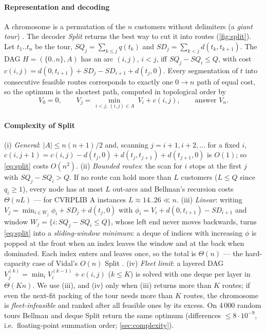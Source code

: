 \paragraph{Representation and decoding} A chromosome is a permutation of the $n$ customers without
delimiters (a \emph{giant tour}) \citep{beasley1983route,prins2004simple}. The decoder \emph{Split}
returns the best way to cut it into routes (\cref{fig:split}). Let $t_1..t_n$ be the tour,
$\mathit{SQ}_j=\sum_{k\le j}q(t_k)$ and $\mathit{SD}_j=\sum_{k<j}d(t_k,t_{k+1})$.
The DAG $H=(\{0..n\},A)$ has an arc $(i,j)$, $i<j$, iff $\mathit{SQ}_j-\mathit{SQ}_i\le Q$, with cost
$c(i,j)=d(0,t_{i+1})+\mathit{SD}_j-\mathit{SD}_{i+1}+d(t_j,0)$. Every segmentation of $t$ into consecutive
feasible routes corresponds to exactly one $0\to n$ path of equal cost, so the optimum is the shortest path,
computed in topological order by
\begin{equation}
V_0=0,\qquad V_j=\min_{\,i<j,\ (i,j)\in A}\ V_i+c(i,j),\qquad \text{answer } V_n. \label{eq:split}
\end{equation}
\paragraph{Complexity of Split} (i) \emph{General}: $|A|\le n(n+1)/2$ and, scanning $j=i+1,i+2,\dots$ for a
fixed $i$, $c(i,j+1)=c(i,j)-d(t_j,0)+d(t_j,t_{j+1})+d(t_{j+1},0)$ is $O(1)$; so \eqref{eq:split} costs
$O(n^2)$. (ii) \emph{Bounded routes}: the scan for $i$ stops at the first $j$ with
$\mathit{SQ}_j-\mathit{SQ}_i>Q$. If no route can hold more than $L$ customers ($L\le Q$ since $q_i\ge1$),
every node has at most $L$ out-arcs and Bellman's recursion costs $\Theta(nL)$ --- for CVRPLIB A
instances $L\approx14..26\ll n$. (iii) \emph{Linear}: writing $V_j=\min_{i\in W_j}\phi_i+\mathit{SD}_j+d(t_j,0)$
with $\phi_i=V_i+d(0,t_{i+1})-\mathit{SD}_{i+1}$ and window $W_j=\{i:\mathit{SQ}_j-\mathit{SQ}_i\le Q\}$, whose left end
never moves backwards, turns \eqref{eq:split} into a \emph{sliding-window minimum}: a deque of
indices with increasing $\phi$ is popped at the front when an index leaves the window and at the back when
dominated. Each index enters and leaves once, so the total is $\Theta(n)$ --- the hard-capacity case of
Vidal's $O(n)$ Split \citep{vidal2016split}. (iv) \emph{Fleet limit}: a layered DAG
$V^{(k)}_j=\min_i V^{(k-1)}_i+c(i,j)$ ($k\le K$) is solved with one deque per layer in $\Theta(Kn)$. We use (iii),
and (iv) only when (iii) returns more than $K$ routes; if even the next-fit packing of the tour needs more
than $K$ routes, the chromosome is \emph{fleet-infeasible} and ranked after all feasible ones by its excess.
On 4\,000 random tours Bellman and deque Split return the same optimum (differences $\le8\cdot10^{-9}$, i.e.\
floating-point summation order; \cref{sec:complexity}).

